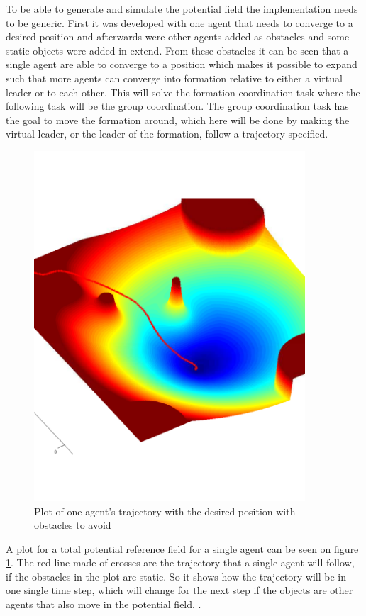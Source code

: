 To be able to generate and simulate the potential field the implementation needs to be generic. First it was developed with one agent that needs to converge to a desired position and afterwards were other agents added as obstacles and some static objects were added in extend. From these obstacles it can be seen that a single agent are able to converge to a position which makes it possible to expand such that more agents can converge into formation relative to either a virtual leader or to each other. This will solve the formation coordination task where the following task will be the group coordination. The group coordination task has the goal to move the formation around, which here will be done by making the virtual leader, or the leader of the formation, follow a trajectory specified.
\begin{figure}[htbp]
  \includegraphics[width=0.9\textwidth]{../../code/matlab/ftotmagnfig1}
  \caption{Plot of one agent's trajectory with the desired position with obstacles to avoid}
  \label{fig:potfieldagenti}
\end{figure}
A plot for a total potential reference field for a single agent can be seen on figure \ref{fig:potfieldagenti}. The red line made of crosses are the trajectory that a single agent will follow, if the obstacles in the plot are static. So it shows how the trajectory will be in one single time step, which will change for the next step if the objects are other agents that also move in the potential field. .

